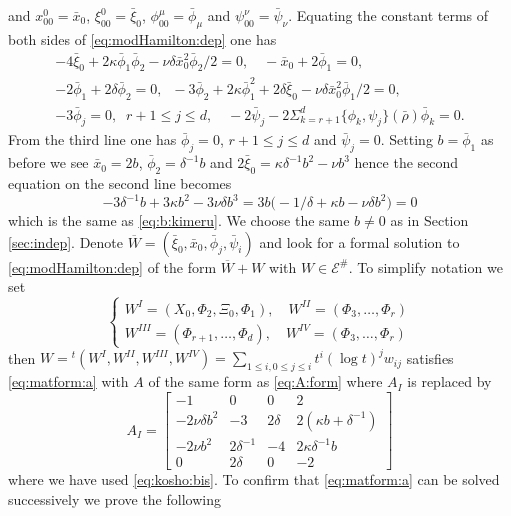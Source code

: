 \documentclass[12pt,leqno]{article} %
\def\bro{\bar\rho}
\def\bro{\bar\rho}
\numberwithin{equation}{section}
\begin{document}
and $x^0_{00}=\bar x_0$, $\xi^0_{00}=\bar\xi_0$, $\phi^{\mu}_{00}=\bar\phi_{\mu}$ and $\psi^{\nu}_{00}=\bar\psi_{\nu}$. Equating the constant terms of both sides of
\eqref{eq:modHamilton:dep} one has 
%
\begin{eqnarray*}
-4\bar\xi_{0}+2\kappa\bar\phi_{1}\bar\phi_{2}-\nu\delta\bar x_{0}^2 \bar\phi_{2}/2=0,\quad-\bar x_{0}+2\bar\phi_{1}=0,\\
-2\bar\phi_{1}+2\delta \bar\phi_{2}=0,\;\;
-3\bar\phi_{2}+2\kappa
\bar\phi_{1}^2+2\delta\bar\xi_0-\nu\delta
\bar x_{0}^2\bar\phi_{1}/2=0,\\
-3\bar\phi_j=0,\;\;r+1\leq j\leq d,\quad -2\bar\psi_j-2\Sigma_{k=r+1}^d\{\phi_k,\psi_j\}(\bro)\bar\phi_k=0.
\end{eqnarray*}
%
From the third line one has $\bar\phi_j=0$, $r+1\leq j\leq d$ and $\bar\psi_j=0$. 
Setting $b=\bar\phi_{1}$ as before we see $\bar x_{0}=2b$, $\bar\phi_{2}=\delta^{-1}b$ and $
2\bar\xi_{0}=\kappa \delta^{-1}b^2-\nu b^3$ hence the second equation on the second line becomes
%
\[
-3\delta^{-1}b+3\kappa b^2- 3\nu\delta  b^3=3b\big(-1/\delta+\kappa b -  \nu\delta  b^2\big)=0
\]
%
which is the same as \eqref{eq:b:kimeru}. We choose the same $b\neq 0$ as in Section \ref{sec:indep}. 
Denote $
\overline{W}=(\bar\xi_0,\bar x_0,\bar\phi_j,\bar\psi_i)$ 
and look for a formal solution to \eqref{eq:modHamilton:dep} of the form $\overline{W}+W$ with $W\in {\mathcal E}^{\#}$. To simplify notation we set
%
\[
\left\{\begin{array}{ll}W^I=(X_0,\Phi_2,\Xi_0,\Phi_1),\quad W^{II}=(\Phi_{3},\ldots,\Phi_r)\\
W^{III}=(\Phi_{r+1},\ldots,\Phi_d),\quad W^{IV}=(\Phi_3,\ldots,\Phi_r)
\end{array}\right.
\]
%
then $W={^t}(W^I, W^{II}, W^{III}, W^{IV})=\sum_{1\leq i,0\leq j\leq i}t^i(\log t)^jw_{ij}$ satisfies \eqref{eq:matform:a}
with $A$ of the same form as \eqref{eq:A:form} where $A_I$ is replaced by
%
%
\begin{equation}
\label{eq:A:I:dep}
A_I=\left[\begin{array}{cccc}
-1&0&0&2\\
-2\nu\delta b^2&-3&2\delta&2(\kappa b+\delta^{-1})\\
-2\nu b^2&2\delta^{-1}&-4&2\kappa\delta^{-1}b\\
0&2\delta&0&-2\end{array}\right]
\end{equation}
%
where we have used \eqref{eq:kosho:bis}. To confirm that \eqref{eq:matform:a} can be solved successively we prove the following
\end{document}
